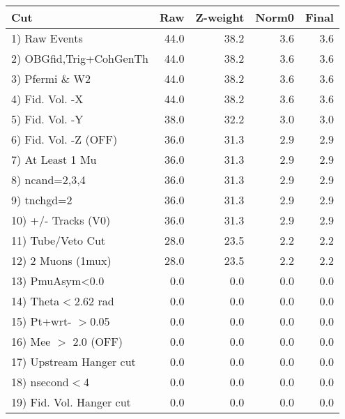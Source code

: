  \begin{table}[h!]\centering
 \begin{tabular}{||l||r|r|r|r||}
 \hline
 \hline
 Cut & Raw & Z-weight & Norm0 & Final \\
 \hline
  1) Raw Events           &        44.0 &        38.2 &         3.6 &         3.6 \\
  2) OBGfid,Trig+CohGenTh &        44.0 &        38.2 &         3.6 &         3.6 \\
  3) Pfermi \& W2         &        44.0 &        38.2 &         3.6 &         3.6 \\
  4) Fid. Vol. -X         &        44.0 &        38.2 &         3.6 &         3.6 \\
  5) Fid. Vol. -Y         &        38.0 &        32.2 &         3.0 &         3.0 \\
  6) Fid. Vol. -Z (OFF)   &        36.0 &        31.3 &         2.9 &         2.9 \\
  7) At Least 1 Mu        &        36.0 &        31.3 &         2.9 &         2.9 \\
  8) ncand=2,3,4          &        36.0 &        31.3 &         2.9 &         2.9 \\
  9) tnchgd=2             &        36.0 &        31.3 &         2.9 &         2.9 \\
 10) +/- Tracks (V0)      &        36.0 &        31.3 &         2.9 &         2.9 \\
 11) Tube/Veto Cut        &        28.0 &        23.5 &         2.2 &         2.2 \\
 12) 2 Muons (1mux)       &        28.0 &        23.5 &         2.2 &         2.2 \\
 13) PmuAsym<0.0          &         0.0 &         0.0 &         0.0 &         0.0 \\
 14) Theta$<$2.62 rad     &         0.0 &         0.0 &         0.0 &         0.0 \\
 15) Pt+wrt- $>$0.05      &         0.0 &         0.0 &         0.0 &         0.0 \\
 16) Mee $>$ 2.0  (OFF)   &         0.0 &         0.0 &         0.0 &         0.0 \\
 17) Upstream Hanger cut  &         0.0 &         0.0 &         0.0 &         0.0 \\
 18) nsecond$<$4          &         0.0 &         0.0 &         0.0 &         0.0 \\
 19) Fid. Vol. Hanger cut &         0.0 &         0.0 &         0.0 &         0.0 \\

\end{tabular}
\end{table}

